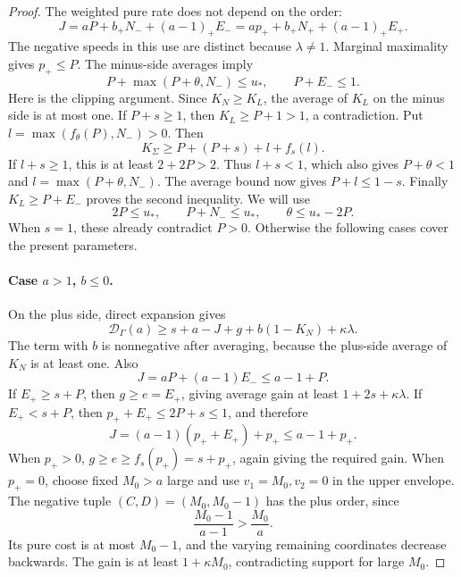 \begin{proof}
The weighted pure rate does not depend on the order:
\begin{equation}\label{eq:source-24}
J=aP+b_+N_-+(a-1)_+E_-
 =a p_++b_+N_++(a-1)_+E_+.
\end{equation}
The negative speeds in this use are distinct because \(\lambda\ne1\).
Marginal maximality gives \(p_+\le P\). The minus-side averages imply
\begin{equation}\label{eq:source-25}
P+\max(P+\theta,N_-)\le u_*,
\qquad P+E_-\le1.
\end{equation}
Here is the clipping argument. Since \(K_N\ge K_L\), the average of
\(K_L\) on the minus side is at most one. If \(P+s\ge1\), then
\(K_L\ge P+1>1\), a contradiction. Put
\(l=\max(f_\theta(P),N_-)>0\). Then
\[
K_\Sigma\ge P+(P+s)+l+f_s(l).
\]
If \(l+s\ge1\), this is at least \(2+2P>2\). Thus \(l+s<1\),
which also gives \(P+\theta<1\) and
\(l=\max(P+\theta,N_-)\). The average bound now gives
\(P+l\le1-s\). Finally \(K_L\ge P+E_-\) proves the second
inequality. We will use
\[
2P\le u_*,\qquad P+N_-\le u_*,
\qquad\theta\le u_*-2P.
\]
When \(s=1\), these already contradict \(P>0\). Otherwise the
following cases cover the present parameters.

\paragraph{Case \(a>1\), \(b\le0\).}
On the plus side, direct expansion gives
\[
\mathcal D_\Gamma(a)\ge s+a-J+g+b(1-K_N)+\kappa\lambda.
\]
The term with \(b\) is nonnegative after averaging, because the
plus-side average of \(K_N\) is at least one. Also
\[
J=aP+(a-1)E_-\le a-1+P.
\]
If \(E_+\ge s+P\), then \(g\ge e=E_+\), giving average gain at
least \(1+2s+\kappa\lambda\). If \(E_+<s+P\), then
\(p_++E_+\le2P+s\le1\), and therefore
\[
J=(a-1)(p_++E_+)+p_+\le a-1+p_+.
\]
When \(p_+>0\), \(g\ge e\ge f_s(p_+)=s+p_+\), again giving the
required gain. When \(p_+=0\), choose fixed \(M_0>a\) large and
use \(v_1=M_0,v_2=0\) in the upper envelope. The negative tuple
\((C,D)=(M_0,M_0-1)\) has the plus order, since
\[
\frac{M_0-1}{a-1}>\frac{M_0}{a}.
\]
Its pure cost is at most \(M_0-1\), and the varying remaining
coordinates decrease backwards. The gain is at least
\(1+\kappa M_0\), contradicting support for large \(M_0\).


\end{proof}
